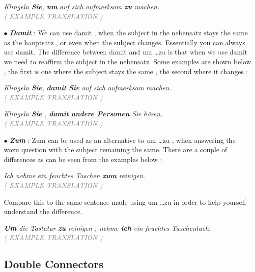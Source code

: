 \documentclass[a4paper,twocolumn,10pt]{article}
\newcommand{\newpar}
{\par \vspace{0.3cm}}
\newcommand{\subsectionend}
{
\nolinenumbers
\linenumbers
}
\newcommand{\bulletpoint}
{ $\bullet$  }
\begin{document}
\noindent
\textit{Klingeln \textbf{Sie}, \textcolor{green-goethe}{\textbf{um}} auf sich aufmerksam
	\textcolor{green-goethe}{\textbf{zu}} machen.}\\
\textcolor{gray} { \textit{( EXAMPLE TRANSLATION )} } \newpar



\bulletpoint \textbf{\textit{Damit}} : We can use damit , when the subject in the nebensatz
stays the same as the hauptsatz , or even when the subject changes. Essentially
you can always use damit. The difference between damit and um \ldots zu is that
when we use damit we need to reaffirm the subject in the nebensatz. Some
examples are shown below , the first is one where the subject stays the same ,
the second where it changes :\newpar

\noindent
\textit{Klingeln \textbf{Sie}, \textcolor{green-goethe}{\textbf{damit}} \textbf{Sie} auf sich aufmerksam machen.}\\
\textcolor{gray} { \textit{( EXAMPLE TRANSLATION )} } \newpar


\noindent
\textit{Klingeln \textbf{Sie} , \textcolor{green-goethe}{\textbf{damit}} \textbf{andere Personen} Sie hören.}\\
\textcolor{gray} { \textit{( EXAMPLE TRANSLATION )} } \newpar




\bulletpoint \textbf{\textit{Zum}} : Zum can be used as an alternative to um
\ldots zu , when answering the wozu question with the subject remaining the
same. There are a couple of differences as can be seen from the examples below
:\newpar

\noindent
\textit{Ich nehme ein feuchtes Taschen \textcolor{green-goethe}{\textbf{zum}} reinigen.}\\
\textcolor{gray} { \textit{( EXAMPLE TRANSLATION )} } \newpar

Compare this to the same sentence made using um \ldots zu in order to help
yourself understand the difference.\newpar

\noindent
\textit{ \textcolor{green-goethe}{\textbf{Um}} die Tastatur
	\textcolor{green-goethe}{\textbf{zu}} reinigen , nehme \textbf{ich} ein feuchtes Taschentuch.}\\
\textcolor{gray} { \textit{( EXAMPLE TRANSLATION )} } \newpar




\subsectionend

\subsection{Double Connectors}
\label{ssec:double_connectors}
\end{document}

